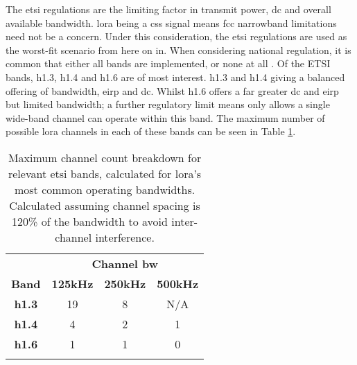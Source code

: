 The \ac{etsi} regulations are the limiting factor in transmit power, \ac{dc} and overall available bandwidth. \ac{lora} being a \ac{css} signal means \ac{fcc} narrowband limitations need not be a concern. Under this consideration, the \ac{etsi} regulations are used as the worst-fit scenario from here on in. When considering national regulation, it is common that either all bands are implemented, or none at all \cite{3YP:CEPT_ERC_REC}. Of the ETSI bands, h1.3, h1.4 and h1.6 are of most interest. h1.3 and h1.4 giving a balanced offering of bandwidth, \ac{eirp} and \ac{dc}. Whilst h1.6 offers a far greater \ac{dc} and \ac{eirp} but limited bandwidth; a further regulatory limit means only allows a single wide-band channel can operate within this band. The maximum number of possible \ac{lora} channels in each of these bands can be seen in Table \ref{tab:ETSILoraChannels}.
\vspace{2.5mm}
\begin{table}[H]
\centering\small
\caption[Maximum channel breakdown for \ac{lora}]{Maximum channel count breakdown for relevant \ac{etsi} bands, calculated for \ac{lora}'s most common operating bandwidths. Calculated assuming channel spacing is 120\%  of the bandwidth to avoid inter-channel interference.}
\label{tab:ETSILoraChannels}
\renewcommand*{\arraystretch}{1.1}
\begin{tabular}{c|ccc}
    \toprule
    & \multicolumn{3}{c}{\textbf{Channel \ac{bw}}}	\\
    \textbf{Band} & \textbf{125kHz} & \textbf{250kHz} & \textbf{500kHz}\\
    \midrule\addlinespace
    \textbf{h1.3} & 19 & 8 & N/A \\
    \textbf{h1.4} & 4 & 2 & 1 \\
    \textbf{h1.6} & 1 & 1 & 0 \\
    \addlinespace\bottomrule
\end{tabular}
\end{table}
